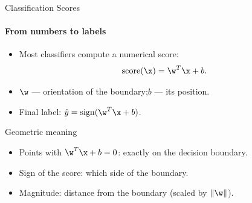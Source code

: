\begin{frame}{Classification Scores}
  \framesubtitle{From numbers to labels}
  \begin{itemize}
    \item Most classifiers compute a numerical \alert{score}:
          \[
            \text{score}(\x) = \w^T\x + b.
          \]
    \item $\w$ — orientation of the boundary;\quad $b$ — its position.
    \item Final label: $\hat{y} = \mathrm{sign}(\w^T\x + b)$.
  \end{itemize}
  \vspace{0.4em}
  \begin{block}{Geometric meaning}
    \begin{itemize}
      \item Points with $\w^T\x + b = 0$: exactly on the \alert{decision boundary}.
      \item Sign of the score: which side of the boundary.
      \item Magnitude: distance from the boundary (scaled by $\|\w\|$).
    \end{itemize}
  \end{block}
\end{frame}

